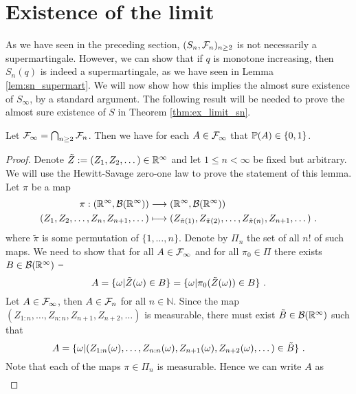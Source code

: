 \section{Existence of the limit} \label{sec:ex_limit}
As we have seen in the preceding section, $(S_n, \F_n)_{n\geq 2}$ is not necessarily a supermartingale. However, we can show that if $q$ is monotone increasing, then $S_n(q)$ is indeed a supermartingale, as we have seen in Lemma \ref{lem:sn_supermart}. We will now show how this implies the almost sure existence of $S_\infty$, by a standard argument. 
%
The following result will be needed to prove the almost sure existence of $S$ in Theorem \ref{thm:ex_limit_sn}.
\begin{lemma} \label{lem:hewitt_savage}
	Let $\F_\infty = \bigcap_{n\geq 2} \F_n$. Then we have for each $A\in \F_\infty$ that $\P(A)\in \{0,1\}$.
	\begin{proof}
		Denote $\tilde{Z}:=(Z_1, Z_2,\dots)\in\R^\infty$ and let $1\leq n<\infty$ be fixed but arbitrary. We will use the Hewitt-Savage zero-one law to prove the statement of this lemma. Let $\pi$  be a map
		\begin{align*}
		\pi: (\R^\infty, \mathcal{B}(\R^\infty)) &\longrightarrow (\R^\infty, \mathcal{B}(\R^\infty))\\
		(Z_1, Z_2,\dots,Z_n, Z_{n+1}, \dots) &\longmapsto (Z_{\tilde\pi(1)}, Z_{\tilde\pi(2)},\dots,Z_{\tilde\pi(n)}, Z_{n+1}, \dots)\mdot
		\end{align*}
		where $\tilde{\pi}$ is some permutation of $\{1,\dots,n\}$. Denote by $\Pi_n$ the set of all $n!$ of such maps. 
		We need to show that for all $A\in\F_\infty$ and for all $\pi_0\in\Pi$ there exists $B\in\mathcal{B}(\R^\infty)$ \st\ 
		\begin{equation}
		A = \{\omega| \tilde{Z}(\omega) \in B\} = \{\omega| \pi_0(\tilde{Z}(\omega)) \in B\} \mdot
		\label{eq:hewitt_savage}
		\end{equation} 	
		Let $A\in\F_\infty$, then $A\in\F_n$ for all $n\in\mathbb{N}$. Since the map $(Z_{1:n}, \dots, Z_{n:n}, Z_{n+1}, Z_{n+2}, \dots)$ is measurable, there must exist $\tilde{B}\in\mathcal{B}(\R^\infty)$ such that
		\begin{equation*}
		A = \{\omega | (Z_{1:n}(\omega), \dots, Z_{n:n}(\omega), Z_{n+1}(\omega), Z_{n+2}(\omega), \dots) \in \tilde{B}\}\mdot 
		\label{eq:A_Z_inv}
		\end{equation*}
		Note that each of the maps $\pi\in\Pi_n$ is measurable. Hence we can write $A$ as
		\begin{align*}

\end{align*}
\end{proof}
\end{lemma}
